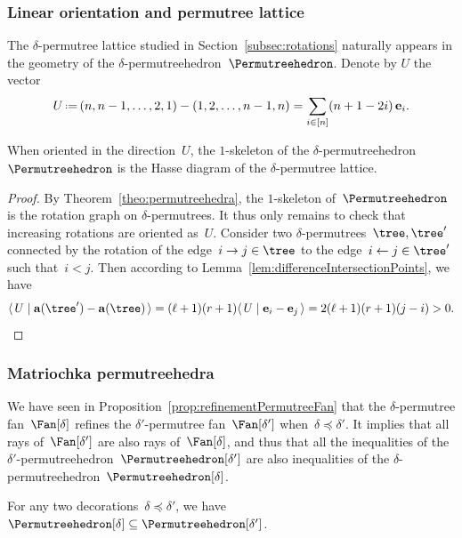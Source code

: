 \documentclass[ALCO]{cedram}
\renewcommand{\b}[1]{\mathbf{#1}} %
\newcommand{\dotprod}[2]{\langle \, #1 \; | \; #2 \, \rangle} %
\newcommand{\eqdef}{\mbox{\,\raisebox{0.2ex}{\scriptsize\ensuremath{\mathrm:}}\ensuremath{=}\,}} %
\newcommand{\decoration}{\delta} %
\newcommand{\less}{\preccurlyeq} %
\begin{document}

\subsubsection{Linear orientation and permutree lattice}

The $\decoration$-permutree lattice studied in Section~\ref{subsec:rotations} naturally appears in the geometry of the $\decoration$-permutreehedron~$\Permutreehedron$. Denote by $U$ the vector
\[
U \eqdef (n,n-1,\dots,2,1) - (1,2,\dots,n-1,n) = \sum_{i \in [n]} (n+1-2i) \, \b{e}_i.
\]

\begin{proposition}
When oriented in the direction~$U$, the $1$-skeleton of the $\decoration$-permutree\-hedron~$\Permutreehedron$ is the Hasse diagram of the $\decoration$-permutree lattice.
\end{proposition}

\begin{proof}
By Theorem~\ref{theo:permutreehedra}, the $1$-skeleton of~$\Permutreehedron$ is the rotation graph on $\decoration$-permutrees. It thus only remains to check that increasing rotations are oriented as~$U$. Consider two $\decoration$-permutrees~$\tree, \tree'$ connected by the rotation of the edge~$i \to j \in \tree$ to the edge~$i \leftarrow j \in \tree'$ such that~$i < j$. Then according to Lemma~\ref{lem:differenceIntersectionPoints}, we have
\[
\dotprod{U}{\b{a}(\tree') - \b{a}(\tree)} = (\ell+1)(r+1) \dotprod{U}{\b{e}_i-\b{e}_j} = 2(\ell+1)(r+1)(j-i) > 0. \qedhere
\]
\end{proof}


\subsubsection{Matriochka permutreehedra}

We have seen in Proposition~\ref{prop:refinementPermutreeFan} that the $\decoration$-permu\-tree fan~$\Fan[\decoration]$ refines the $\decoration'$-permutree fan~$\Fan[\decoration']$ when~$\decoration \less \decoration'$. It implies that all rays of~$\Fan[\decoration']$ are also rays of~$\Fan[\decoration]$, and thus that all the inequalities of the $\decoration'$-permutreehe\-dron~$\Permutreehedron[\decoration']$ are also inequalities of the $\decoration$-permutreehedron~$\Permutreehedron[\decoration]$.

\begin{corollary}
For any two decorations~$\decoration \less \decoration'$, we have~$\Permutreehedron[\decoration] \subseteq \Permutreehedron[\decoration']$.
\end{corollary}
\end{document}
